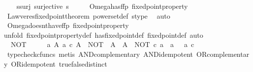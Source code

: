 \begin{isabellebody}
\ \ \isamarkupfalse%
\ s{\isacharunderscore}{\kern0pt}surj{\isacharcolon}{\kern0pt}\ {\isachardoublequoteopen}surjective\ s{\isachardoublequoteclose}\isanewline
\ \ \isamarkupfalse%
\ \isamarkupfalse%
\ Omega{\isacharunderscore}{\kern0pt}has{\isacharunderscore}{\kern0pt}ffp{\isacharcolon}{\kern0pt}\ {\isachardoublequoteopen}fixed{\isacharunderscore}{\kern0pt}point{\isacharunderscore}{\kern0pt}property\ {\isasymOmega}{\isachardoublequoteclose}\isanewline
\ \ \ \ \isamarkupfalse%
\ Lawveres{\isacharunderscore}{\kern0pt}fixed{\isacharunderscore}{\kern0pt}point{\isacharunderscore}{\kern0pt}theorem\ powerset{\isacharunderscore}{\kern0pt}def\ s{\isacharunderscore}{\kern0pt}type\ \isamarkupfalse%
\ auto\isanewline
\ \ \isamarkupfalse%
\ Omega{\isacharunderscore}{\kern0pt}doesnt{\isacharunderscore}{\kern0pt}have{\isacharunderscore}{\kern0pt}ffp{\isacharcolon}{\kern0pt}\ {\isachardoublequoteopen}{\isasymnot}{\isacharparenleft}{\kern0pt}fixed{\isacharunderscore}{\kern0pt}point{\isacharunderscore}{\kern0pt}property\ {\isasymOmega}{\isacharparenright}{\kern0pt}{\isachardoublequoteclose}\isanewline
\ \ \isamarkupfalse%
{\isacharparenleft}{\kern0pt}unfold\ fixed{\isacharunderscore}{\kern0pt}point{\isacharunderscore}{\kern0pt}property{\isacharunderscore}{\kern0pt}def\ has{\isacharunderscore}{\kern0pt}fixed{\isacharunderscore}{\kern0pt}point{\isacharunderscore}{\kern0pt}def\ fixed{\isacharunderscore}{\kern0pt}point{\isacharunderscore}{\kern0pt}def{\isacharcomma}{\kern0pt}\ auto{\isacharparenright}{\kern0pt}\ \ \ \isanewline
\ \ \ \ \isamarkupfalse%
\ \ {\isachardoublequoteopen}NOT\ {\isacharcolon}{\kern0pt}\ {\isasymOmega}\ {\isasymrightarrow}\ {\isasymOmega}\ {\isasymand}\ {\isacharparenleft}{\kern0pt}{\isasymforall}a{\isachardot}{\kern0pt}\ {\isacharparenleft}{\kern0pt}{\isasymforall}A{\isachardot}{\kern0pt}\ a\ {\isasymin}\isactrlsub c\ A\ {\isasymlongrightarrow}\ NOT\ {\isacharcolon}{\kern0pt}\ A\ {\isasymrightarrow}\ A\ {\isasymlongrightarrow}\ NOT\ {\isasymcirc}\isactrlsub c\ a\ {\isasymnoteq}\ a{\isacharparenright}{\kern0pt}\ {\isasymor}\ {\isasymnot}\ a\ {\isasymin}\isactrlsub c\ {\isasymOmega}{\isacharparenright}{\kern0pt}{\isachardoublequoteclose}\isanewline
\ \ \ \ \ \ \isamarkupfalse%
\ {\isacharparenleft}{\kern0pt}typecheck{\isacharunderscore}{\kern0pt}cfuncs{\isacharcomma}{\kern0pt}\ metis\ AND{\isacharunderscore}{\kern0pt}complementary\ AND{\isacharunderscore}{\kern0pt}idempotent\ OR{\isacharunderscore}{\kern0pt}complementary\ OR{\isacharunderscore}{\kern0pt}idempotent\ true{\isacharunderscore}{\kern0pt}false{\isacharunderscore}{\kern0pt}distinct{\isacharparenright}{\kern0pt}\isanewline

\end{isabellebody}
